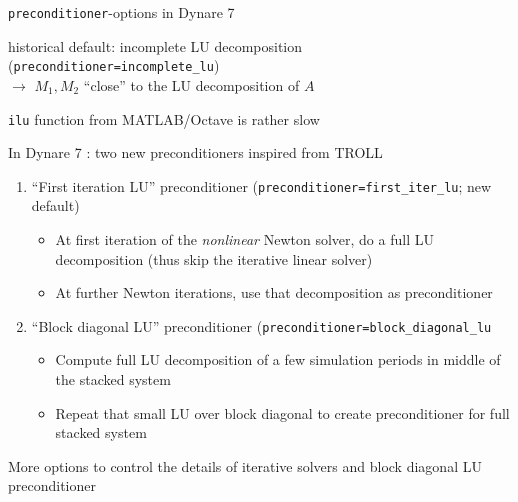 \documentclass[handout,usepdftitle=false,xcolor=dvipsnames,aspectratio=169]{beamer}
\begin{document}
\begin{frame}{\texttt{preconditioner}-options in Dynare 7}
  \begin{witemize}
       \item historical default: incomplete LU decomposition (\texttt{preconditioner=incomplete\_lu})\\
          $\rightarrow$ $M_1,M_2$ “close” to the LU decomposition of $A$
    \item  \texttt{ilu} function from MATLAB/Octave is rather slow
    \item In Dynare 7 : two new preconditioners inspired from TROLL
    \begin{enumerate}
      \item “First iteration LU” preconditioner (\texttt{preconditioner=first\_iter\_lu}; new default)
          \begin{itemize}
            \item At first iteration of the \textit{nonlinear} Newton solver, do a full LU decomposition (thus skip the iterative linear solver)
            \item At further Newton iterations, use that decomposition as preconditioner
          \end{itemize}
    \item “Block diagonal LU” preconditioner (\texttt{preconditioner=block\_diagonal\_lu}
          \begin{itemize}
            \item Compute full LU decomposition of a few simulation periods in middle of the stacked system
            \item Repeat that small LU over block diagonal to create
                  preconditioner for full stacked system
          \end{itemize}
    \end{enumerate}
    \item More options to control the details of iterative solvers and block
          diagonal LU preconditioner
  \end{witemize}
\end{frame}
\end{document}
